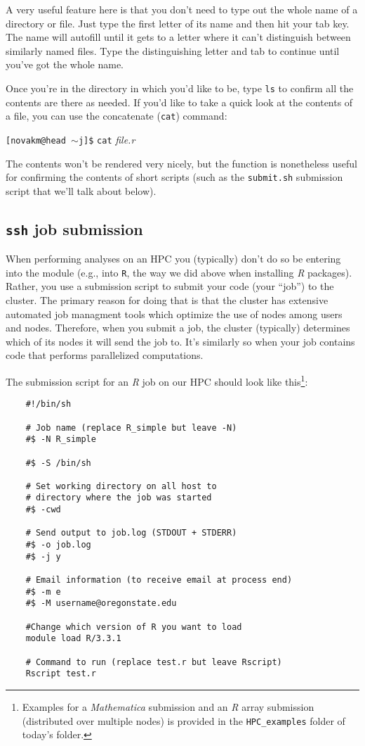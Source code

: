 \documentclass[12pt,letterpaper]{article}
\begin{document}
A very useful feature here is that you don't need to type out the whole name of a directory or file.
Just type the first letter of its name and then hit your tab key.
The name will autofill until it gets to a letter where it can't distinguish between similarly named files.
Type the distinguishing letter and tab to continue until you've got the whole name.

Once you're in the directory in which you'd like to be, type \texttt{ls} to confirm all the contents are there as needed.
If you'd like to take a quick look at the contents of a file, you can use the concatenate (\texttt{cat}) command:

\texttt{[novakm@head $\sim$j]\$} \texttt{cat} \emph{file.r}

\noindent
The contents won't be rendered very nicely, but the function is nonetheless useful for confirming the contents of short scripts (such as the \texttt{submit.sh} submission script that we'll talk about below).



\subsection{\texttt{ssh} job submission}
When performing analyses on an HPC you (typically) don't do so be entering into the module (e.g., into \texttt{R}, the way we did above when installing \emph{R} packages).
Rather, you use a submission script to submit your code (your ``job'') to the cluster.
The primary reason for doing that is that the cluster has extensive automated job managment tools which optimize the use of nodes among users and nodes.
Therefore, when you submit a job, the cluster (typically) determines which of its nodes it will send the job to.
It's similarly so when your job contains code that performs parallelized computations.

The submission script for an \emph{R} job on our HPC should look like this\footnote{Examples for a \emph{Mathematica} submission and an \emph{R} array submission (distributed over multiple nodes) is provided in the \texttt{HPC\_examples} folder of today's folder.}:
\begin{verbatim}
	#!/bin/sh

	# Job name (replace R_simple but leave -N)
	#$ -N R_simple

	#$ -S /bin/sh

	# Set working directory on all host to
	# directory where the job was started
	#$ -cwd

	# Send output to job.log (STDOUT + STDERR)
	#$ -o job.log
	#$ -j y

	# Email information (to receive email at process end)
	#$ -m e
	#$ -M username@oregonstate.edu

	#Change which version of R you want to load
	module load R/3.3.1

	# Command to run (replace test.r but leave Rscript)
	Rscript test.r
\end{verbatim}
\end{document}
